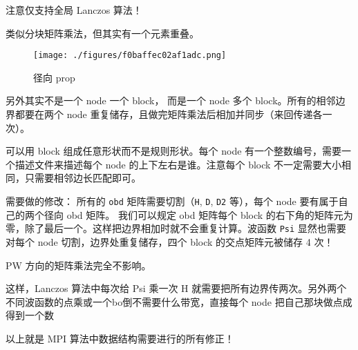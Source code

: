 
注意仅支持全局 Lanczos 算法！

类似分块矩阵乘法，但其实有一个元素重叠。
\begin{figure}[ht]
\centering
\texttt{[image: ./figures/f0baffec02af1adc.png]}
\caption{径向 prop} \label{fig_HeMPI_1}
\end{figure}
另外其实不是一个 node 一个 block， 而是一个 node 多个 block。所有的相邻边界都要在两个 node 重复储存，且做完矩阵乘法后相加并同步（来回传递各一次）。

可以用 block 组成任意形状而不是规则形状。每个 node 有一个整数编号，需要一个描述文件来描述每个 node 的上下左右是谁。注意每个 block 不一定需要大小相同，只需要相邻边长匹配即可。

需要做的修改： 所有的 \verb`obd` 矩阵需要切割（\verb`H`, \verb`D`, \verb`D2` 等），每个 node 要有属于自己的两个径向 obd 矩阵。 我们可以规定 obd 矩阵每个 block 的右下角的矩阵元为零，除了最后一个。这样把边界相加时就不会重复计算。波函数 \verb`Psi` 显然也需要对每个 node 切割，边界处重复储存，四个 block 的交点矩阵元被储存 4 次！

PW 方向的矩阵乘法完全不影响。

这样，Lanczos 算法中每次给 Psi 乘一次 H 就需要把所有边界传两次。另外两个不同波函数的点乘或一个bo倒不需要什么带宽，直接每个 node 把自己那块做点成得到一个数

以上就是 MPI 算法中数据结构需要进行的所有修正！

